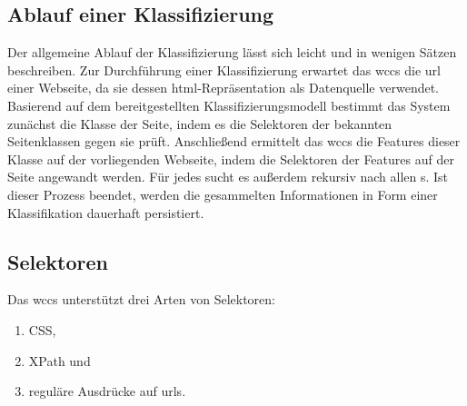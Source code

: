     \subsection{Ablauf einer Klassifizierung}
        \label{section:solutionConceptClassificationAlg}
        Der allgemeine Ablauf der Klassifizierung lässt sich leicht und in wenigen Sätzen beschreiben.
        Zur Durchführung einer Klassifizierung erwartet das \gls{wccs} die \gls{url} einer Webseite,
        da sie dessen \gls{html}-Repräsentation als Datenquelle verwendet.
        Basierend auf dem bereitgestellten Klassifizierungsmodell
        bestimmt das System zunächst die Klasse der Seite,
        indem es die Selektoren der bekannten Seitenklassen gegen sie prüft.
        Anschließend ermittelt das \gls{wccs} die Features dieser Klasse auf der vorliegenden Webseite,
        indem die Selektoren der Features auf der Seite angewandt werden.
        Für jedes {\contentFeature} sucht es außerdem rekursiv nach allen {\childFeature}s.
        Ist dieser Prozess beendet, werden die gesammelten Informationen in Form einer Klassifikation
        dauerhaft persistiert.

    \subsection{Selektoren}
        \label{section:conceptSupportedSelectors}
        Das \gls{wccs} unterstützt drei Arten von Selektoren:

        \begin{enumerate}
            \item CSS,
            \item XPath und
            \item reguläre Ausdrücke auf \glspl{url}.
        \end{enumerate}

